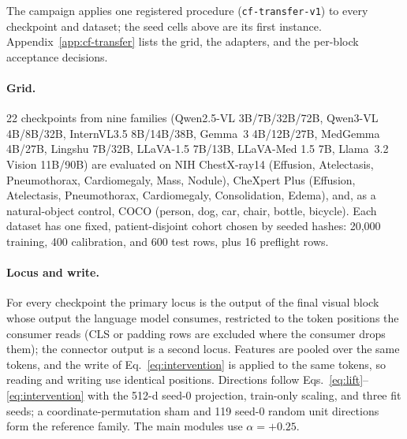 The campaign applies one registered procedure (\texttt{cf-transfer-v1}) to every checkpoint and dataset; the seed cells above are its first instance. Appendix~\ref{app:cf-transfer} lists the grid, the adapters, and the per-block acceptance decisions.

\paragraph{Grid.}
22 checkpoints from nine families (Qwen2.5-VL 3B/7B/32B/72B, Qwen3-VL 4B/8B/32B, InternVL3.5 8B/14B/38B, Gemma~3 4B/12B/27B, MedGemma 4B/27B, Lingshu 7B/32B, LLaVA-1.5 7B/13B, LLaVA-Med 1.5 7B, Llama~3.2 Vision 11B/90B) are evaluated on NIH ChestX-ray14 (Effusion, Atelectasis, Pneumothorax, Cardiomegaly, Mass, Nodule), CheXpert Plus (Effusion, Atelectasis, Pneumothorax, Cardiomegaly, Consolidation, Edema), and, as a natural-object control, COCO (person, dog, car, chair, bottle, bicycle). Each dataset has one fixed, patient-disjoint cohort chosen by seeded hashes: 20,000 training, 400 calibration, and 600 test rows, plus 16 preflight rows.

\paragraph{Locus and write.}
For every checkpoint the primary locus is the output of the final visual block whose output the language model consumes, restricted to the token positions the consumer reads (CLS or padding rows are excluded where the consumer drops them); the connector output is a second locus. Features are pooled over the same tokens, and the write of Eq.~\ref{eq:intervention} is applied to the same tokens, so reading and writing use identical positions. Directions follow Eqs.~\ref{eq:lift}--\ref{eq:intervention} with the 512-d seed-0 projection, train-only scaling, and three fit seeds; a coordinate-permutation sham and 119 seed-0 random unit directions form the reference family. The main modules use $\alpha=+0.25$.

